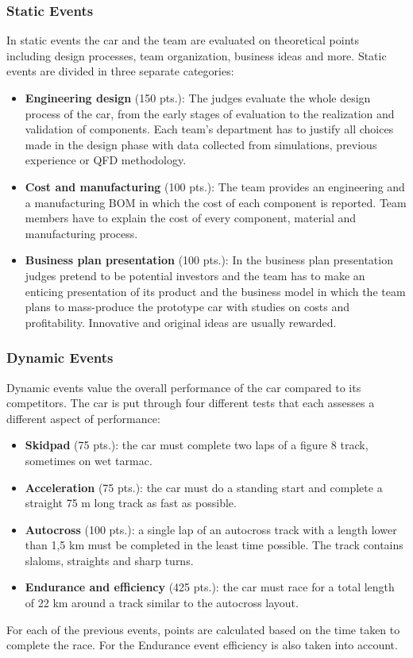 \subsubsection{Static Events}
In static events the car and the team are evaluated on theoretical points including design processes, team organization, business ideas and more.
Static events are divided in three separate categories:
\begin{itemize}
    \item \textbf{Engineering design} (150 pts.): The judges evaluate the whole design process of the car, from the early stages of evaluation to the realization and validation of components. Each team's department has to justify all choices made in the design phase with data collected from simulations, previous experience or QFD methodology.
    \item \textbf{Cost and manufacturing} (100 pts.): The team provides an engineering and a manufacturing BOM in which the cost of each component is reported. Team members have to explain the cost of every component, material and manufacturing process.
    \item \textbf{Business plan presentation} (100 pts.): In the business plan presentation judges pretend to be potential investors and the team has to make an enticing presentation of its product and the business model in which the team plans to mass-produce the prototype car with studies on costs and profitability. Innovative and original ideas are usually rewarded.
\end{itemize}

\subsubsection{Dynamic Events}
Dynamic events value the overall performance of the car compared to its competitors. The car is put through four different tests that each assesses a different aspect of performance:
\begin{itemize}
    \item \textbf{Skidpad} (75 pts.): the car must complete two laps of a figure 8 track, sometimes on wet tarmac.
    \item \textbf{Acceleration} (75 pts.): the car must do a standing start and complete a straight 75 m long track as fast as possible.
    \item \textbf{Autocross} (100 pts.): a single lap of an autocross track with a length lower than 1,5 km must be completed in the least time possible. The track contains slaloms, straights and sharp turns.
    \item \textbf{Endurance and efficiency} (425 pts.): the car must race for a total length of 22 km around a track similar to the autocross layout.
\end{itemize}
For each of the previous events, points are calculated based on the time taken to complete the race. For the Endurance event efficiency is also taken into account.

